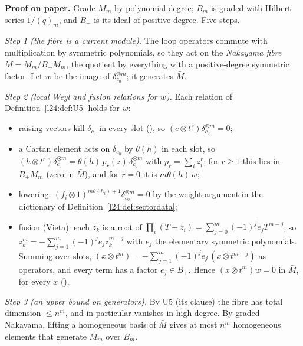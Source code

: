 \textbf{Proof on paper.} Grade $M_m$ by polynomial degree; $B_m$ is graded with Hilbert series $1/(q)_m$, and
$B_+$ is its ideal of positive degree. Five steps.

\emph{Step 1 (the fibre is a current module).} The loop operators commute with multiplication by symmetric polynomials, so
they act on the \emph{Nakayama fibre} $\bar M=M_m/B_+M_m$, the quotient by everything with a positive-degree symmetric factor.
Let $w$ be the image of $\delta_{c_0}^{\otimes m}$; it generates $\bar M$.

\emph{Step 2 (local Weyl and fusion relations for $w$).} Each relation of Definition~\ref{l24:def:U5} holds for $w$:
\begin{itemize}
\item raising vectors kill $\delta_{c_0}$ in every slot (), so $(e\otimes t^r)\delta_{c_0}^{\otimes m}=0$;
\item a Cartan element acts on $\delta_{c_0}$ by $\theta(h)$ in each slot, so $(h\otimes t^r)\delta_{c_0}^{\otimes m}=\theta(h)\,p_r(z)\,\delta_{c_0}^{\otimes m}$
  with $p_r=\sum_iz_i^r$; for $r\ge1$ this lies in $B_+M_m$ (zero in $\bar M$), and for $r=0$ it is $m\theta(h)\,w$;
\item lowering: $(f_i\otimes1)^{m\theta(h_i)+1}\delta_{c_0}^{\otimes m}=0$ by the weight argument in the dictionary of
  Definition~\ref{l24:def:sectordata};
\item fusion (Vieta): each $z_k$ is a root of $\prod_i(T-z_i)=\sum_{j=0}^m(-1)^je_jT^{m-j}$, so
  $z_k^m=-\sum_{j=1}^m(-1)^je_jz_k^{m-j}$ with $e_j$ the elementary symmetric polynomials. Summing over slots,
  $(x\otimes t^m)=-\sum_{j=1}^m(-1)^je_j\,(x\otimes t^{m-j})$ as operators, and every term has a factor $e_j\in B_+$. Hence
  $(x\otimes t^m)w=0$ in $\bar M$, for every $x$ ().
\end{itemize}

\emph{Step 3 (an upper bound on generators).} By U5 (its  clause) the fibre has total dimension $\le n^m$, and in
particular vanishes in high degree. By graded Nakayama, lifting a homogeneous basis of $\bar M$ gives at most $n^m$ homogeneous
elements that generate $M_m$ over $B_m$.

